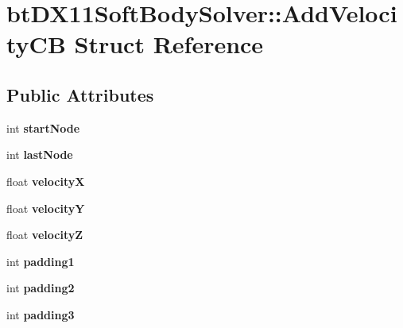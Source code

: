 \hypertarget{structbt_d_x11_soft_body_solver_1_1_add_velocity_c_b}{\section{bt\+D\+X11\+Soft\+Body\+Solver\+:\+:Add\+Velocity\+C\+B Struct Reference}
\label{structbt_d_x11_soft_body_solver_1_1_add_velocity_c_b}
}
\subsection*{Public Attributes}
\begin{DoxyCompactItemize}
\item 
\hypertarget{structbt_d_x11_soft_body_solver_1_1_add_velocity_c_b_ad2682f9fbf30797b40793757174048f6}{int {\bfseries start\+Node}}\label{structbt_d_x11_soft_body_solver_1_1_add_velocity_c_b_ad2682f9fbf30797b40793757174048f6}

\item 
\hypertarget{structbt_d_x11_soft_body_solver_1_1_add_velocity_c_b_a9d9cd491315336fa7bf928e34cbc08c0}{int {\bfseries last\+Node}}\label{structbt_d_x11_soft_body_solver_1_1_add_velocity_c_b_a9d9cd491315336fa7bf928e34cbc08c0}

\item 
\hypertarget{structbt_d_x11_soft_body_solver_1_1_add_velocity_c_b_aa984e2b59be1d05717c8b7330b616db3}{float {\bfseries velocity\+X}}\label{structbt_d_x11_soft_body_solver_1_1_add_velocity_c_b_aa984e2b59be1d05717c8b7330b616db3}

\item 
\hypertarget{structbt_d_x11_soft_body_solver_1_1_add_velocity_c_b_ad3d0c9168747627365da91560035f643}{float {\bfseries velocity\+Y}}\label{structbt_d_x11_soft_body_solver_1_1_add_velocity_c_b_ad3d0c9168747627365da91560035f643}

\item 
\hypertarget{structbt_d_x11_soft_body_solver_1_1_add_velocity_c_b_a11fa690326828ae037fe253cd26a2aa3}{float {\bfseries velocity\+Z}}\label{structbt_d_x11_soft_body_solver_1_1_add_velocity_c_b_a11fa690326828ae037fe253cd26a2aa3}

\item 
\hypertarget{structbt_d_x11_soft_body_solver_1_1_add_velocity_c_b_a95978e53ee0eeea3085dad395b006167}{int {\bfseries padding1}}\label{structbt_d_x11_soft_body_solver_1_1_add_velocity_c_b_a95978e53ee0eeea3085dad395b006167}

\item 
\hypertarget{structbt_d_x11_soft_body_solver_1_1_add_velocity_c_b_ad5718d6bb92d08310ac268286ad1794a}{int {\bfseries padding2}}\label{structbt_d_x11_soft_body_solver_1_1_add_velocity_c_b_ad5718d6bb92d08310ac268286ad1794a}

\item 
\hypertarget{structbt_d_x11_soft_body_solver_1_1_add_velocity_c_b_a7816f132f201fb264c5a0de26b4e7d4c}{int {\bfseries padding3}}\label{structbt_d_x11_soft_body_solver_1_1_add_velocity_c_b_a7816f132f201fb264c5a0de26b4e7d4c}

\end{DoxyCompactItemize}


